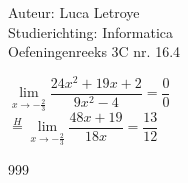 \documentclass[a4paper]{article}
\begin{document}
  
\noindent \large Auteur: Luca Letroye        \\
\noindent \large Studierichting: Informatica \\
\noindent \large Oefeningenreeks 3C nr. 16.4 \\

\medskip

\normalsize

$ \lim\limits_{x \rightarrow -\tfrac{2}{3}} \dfrac{24x^2+19x+2}{9x^2-4} = \dfrac{0}{0}$\\

$ \overset{H}{=}  \lim\limits_{x \rightarrow -\tfrac{2}{3}} \dfrac{48x+19}{18x} = \dfrac{13}{12}$\\





\begin{thebibliography}{999}
\end{thebibliography}
\end{document}
